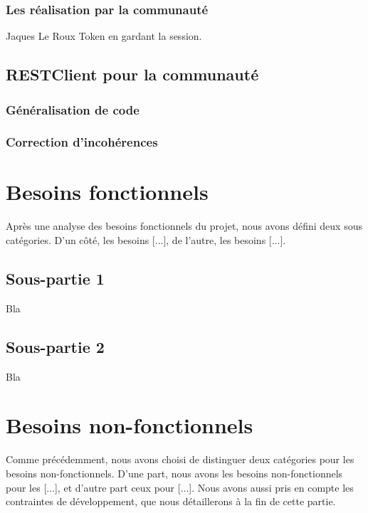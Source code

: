 \subsubsection{Les réalisation par la communauté}

Jaques Le Roux Token en gardant la session.
\subsection{RESTClient pour la communauté}
\subsubsection{Généralisation de code}
\subsubsection{Correction d'incohérences}



\iffalse
\section{Besoins fonctionnels}

Après une analyse des besoins fonctionnels du projet, nous avons défini deux sous catégories. D'un côté, les besoins [...], de l'autre, les besoins [...].

\subsection{Sous-partie 1}

Bla

\subsection{Sous-partie 2}

Bla

\newpage

\section{Besoins non-fonctionnels}

Comme précédemment, nous avons choisi de distinguer deux catégories pour les besoins non-fonctionnels. D'une part, nous avons les besoins non-fonctionnels pour les [...], et d'autre part ceux pour [...]. Nous avons aussi pris en compte les contraintes de développement, que nous détaillerons à la fin de cette partie.

